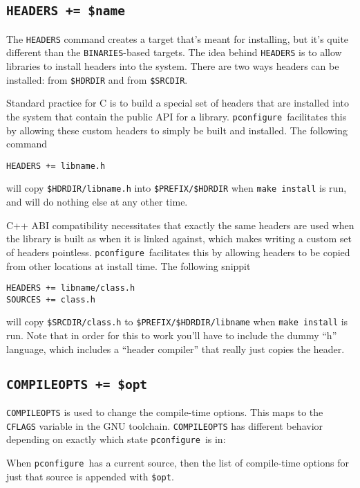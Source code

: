 \documentclass{article}
\newcommand{\pconfigure}{\texttt{pconfigure}}
\begin{document}
\subsection{\texttt{HEADERS += \$name}}

The \texttt{HEADERS} command creates a target that's meant for
installing, but it's quite different than the \texttt{BINARIES}-based
targets.  The idea behind \texttt{HEADERS} is to allow libraries to
install headers into the system.  There are two ways headers can be
installed: from \texttt{\$HDRDIR} and from \texttt{\$SRCDIR}.

Standard practice for C is to build a special set of headers that are
installed into the system that contain the public API for a library.
\pconfigure\ facilitates this by allowing these custom headers to
simply be built and installed.  The following command
\begin{verbatim}
HEADERS += libname.h
\end{verbatim}
will copy \texttt{\$HDRDIR/libname.h} into \texttt{\$PREFIX/\$HDRDIR}
when \texttt{make install} is run, and will do nothing else at any
other time.

C++ ABI compatibility necessitates that exactly the same headers are
used when the library is built as when it is linked against, which
makes writing a custom set of headers pointless.
\pconfigure\ facilitates this by allowing headers to be copied from
other locations at install time.  The following snippit
\begin{verbatim}
HEADERS += libname/class.h
SOURCES += class.h
\end{verbatim}
will copy \texttt{\$SRCDIR/class.h} to
\texttt{\$PREFIX/\$HDRDIR/libname} when \texttt{make install} is run.
Note that in order for this to work you'll have to include the dummy
``h'' language, which includes a ``header compiler'' that really just
copies the header.

\subsection{\texttt{COMPILEOPTS += \$opt} \label{cmd:compileopts}}

\texttt{COMPILEOPTS} is used to change the compile-time options.  This
maps to the \texttt{CFLAGS} variable in the GNU toolchain.
\texttt{COMPILEOPTS} has different behavior depending on exactly which
state \pconfigure\ is in:

When \pconfigure\ has a current source, then the list of compile-time
options for just that source is appended with \texttt{\$opt}.
\end{document}
